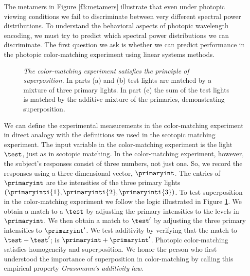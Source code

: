 The metamers in Figure \ref{f3:metamers} illustrate
that even under photopic viewing
conditions we fail to discriminate
between very different spectral power distributions.
To understand the behavioral aspects of photopic
wavelength encoding, we must try to predict
which spectral power distributions we can discriminate.
The first question we ask is whether we can
predict performance in the
photopic color-matching experiment using linear systems methods.

\begin{figure}
\centerline {
}
\caption[Color Matching Superposition]{
{\em The color-matching experiment satisfies the principle of
superposition.} In parts (a) and (b) test lights are matched by
a mixture of three primary lights.  In part (c) the sum of
the test lights is matched by the additive mixture of the
primaries, demonstrating superposition.
}
\label{f3:phot.superposition}
\end{figure}
We can define the experimental measurements in the
color-matching experiment in direct analogy with 
the definitions we used in the scotopic matching experiment.
The input variable in the color-matching experiment
is the light $\test$, just as in scotopic matching.
In the color-matching experiment, however, the subject's responses
consist of three numbers, not just one.
So, we record the responses using a three-dimensional
vector, $\primaryint$.
The entries of $\primaryint$
are the intensities of the three primary lights 
$( \primaryinti{1} , \primaryinti{2} , \primaryinti{3} )$.
To test superposition in the color-matching experiment
we follow the logic
illustrated in Figure \ref{f3:phot.superposition}.
We obtain a match to a $\test$
by adjusting the primary intensities to the levels in $\primaryint$.
We then obtain a match to $\test '$ by adjusting
the three primary intensities to $\primaryint '$.
We test additivity by verifying that the match
to $\test + \test '$;
is $\primaryint + { \primaryint '}$.
Photopic color-matching satisfies homogeneity and superposition.
We honor the person who first understood the importance
of superposition in color-matching by calling this
empirical property {\em Grassmann's additivity law}.

